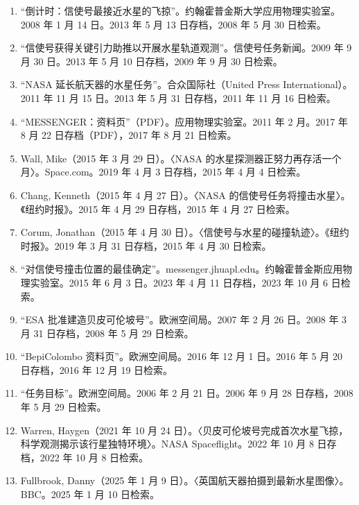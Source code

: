 \begin{enumerate}
    \item “倒计时：信使号最接近水星的飞掠”。约翰霍普金斯大学应用物理实验室。2008 年 1 月 14 日。2013 年 5 月 13 日存档，2008 年 5 月 30 日检索。
    \item “信使号获得关键引力助推以开展水星轨道观测”。信使号任务新闻。2009 年 9 月 30 日。2013 年 5 月 10 日存档，2009 年 9 月 30 日检索。
    \item “NASA 延长航天器的水星任务”。合众国际社（United Press International）。2011 年 11 月 15 日。2013 年 5 月 31 日存档，2011 年 11 月 16 日检索。
    \item “MESSENGER：资料页”（PDF）。应用物理实验室。2011 年 2 月。2017 年 8 月 22 日存档（PDF），2017 年 8 月 21 日检索。
    \item Wall, Mike（2015 年 3 月 29 日）。〈NASA 的水星探测器正努力再存活一个月〉。Space.com。2019 年 4 月 3 日存档，2015 年 4 月 4 日检索。
    \item Chang, Kenneth（2015 年 4 月 27 日）。〈NASA 的信使号任务将撞击水星〉。《纽约时报》。2015 年 4 月 29 日存档，2015 年 4 月 27 日检索。
    \item Corum, Jonathan（2015 年 4 月 30 日）。〈信使号与水星的碰撞轨迹〉。《纽约时报》。2019 年 3 月 31 日存档，2015 年 4 月 30 日检索。
    \item “对信使号撞击位置的最佳确定”。messenger.jhuapl.edu。约翰霍普金斯应用物理实验室。2015 年 6 月 3 日。2023 年 4 月 11 日存档，2023 年 10 月 6 日检索。
    \item “ESA 批准建造贝皮可伦坡号”。欧洲空间局。2007 年 2 月 26 日。2008 年 3 月 31 日存档，2008 年 5 月 29 日检索。
    \item “BepiColombo 资料页”。欧洲空间局。2016 年 12 月 1 日。2016 年 5 月 20 日存档，2016 年 12 月 19 日检索。
    \item “任务目标”。欧洲空间局。2006 年 2 月 21 日。2006 年 9 月 28 日存档，2008 年 5 月 29 日检索。
    \item Warren, Haygen（2021 年 10 月 24 日）。〈贝皮可伦坡号完成首次水星飞掠，科学观测揭示该行星独特环境〉。NASA Spaceflight。2022 年 10 月 8 日存档，2022 年 10 月 8 日检索。
    \item Fullbrook, Danny（2025 年 1 月 9 日）。〈英国航天器拍摄到最新水星图像〉。BBC。2025 年 1 月 10 日检索。
\end{enumerate}
